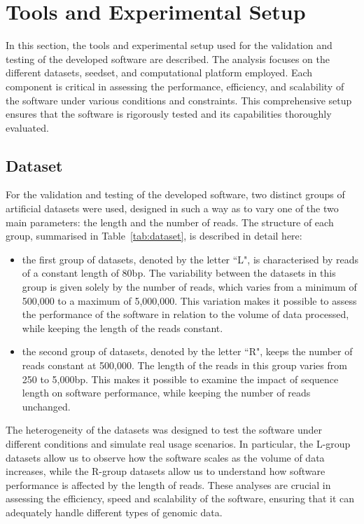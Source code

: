 \section{Tools and Experimental Setup}
\label{sec:experimental-setup}

In this section, the tools and experimental setup used for the validation and testing of the developed software are described. The analysis focuses on the different datasets, seedset, and computational platform employed. Each component is critical in assessing the performance, efficiency, and scalability of the software under various conditions and constraints. This comprehensive setup ensures that the software is rigorously tested and its capabilities thoroughly evaluated.




	\subsection{Dataset}
	\label{subsec:dataset}
	
	For the validation and testing of the developed software, two distinct groups of artificial datasets were used, designed in such a way as to vary one of the two main parameters: the length and the number of reads. The structure of each group, summarised in Table~\ref{tab:dataset}, is described in detail here:
	\begin{itemize}
		\item the first group of datasets, denoted by the letter “L", is characterised by reads of a constant length of 80bp. The variability between the datasets in this group is given solely by the number of reads, which varies from a minimum of 500,000 to a maximum of 5,000,000. This variation makes it possible to assess the performance of the software in relation to the volume of data processed, while keeping the length of the reads constant.
		
		\item the second group of datasets, denoted by the letter “R", keeps the number of reads constant at 500,000. The length of the reads in this group varies from 250 to 5,000bp. This makes it possible to examine the impact of sequence length on software performance, while keeping the number of reads unchanged.
	\end{itemize}
	
	The heterogeneity of the datasets was designed to test the software under different conditions and simulate real usage scenarios. In particular, the L-group datasets allow us to observe how the software scales as the volume of data increases, while the R-group datasets allow us to understand how software performance is affected by the length of reads. These analyses are crucial in assessing the efficiency, speed and scalability of the software, ensuring that it can adequately handle different types of genomic data.

